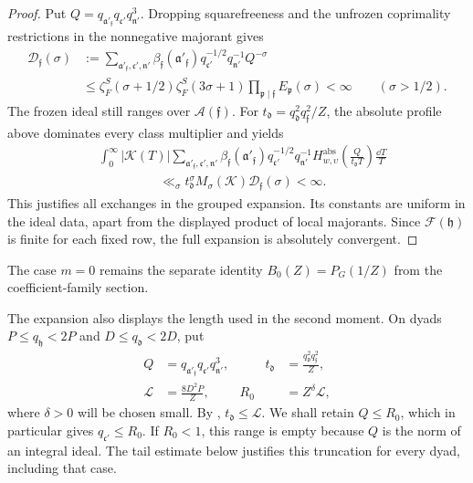 \begin{proof}
Put \(Q=q_{\mathfrak a'_{\mathfrak f}}q_{\mathfrak c'}q_{\mathfrak n'}^3\).
Dropping squarefreeness and the unfrozen coprimality restrictions in the
nonnegative majorant gives
\begin{equation}\label{eq:reflection-reflected-Dirichlet}
\begin{split}
 \mathcal D_{\mathfrak f}(\sigma)
 &:=\sum_{\mathfrak a'_{\mathfrak f},\mathfrak c',\mathfrak n'}
       \beta_{\mathfrak f}(\mathfrak a'_{\mathfrak f})
       q_{\mathfrak c'}^{-1/2}q_{\mathfrak n'}^{-1}Q^{-\sigma}\\
 &\le\zeta_F^S(\sigma+1/2)\zeta_F^S(3\sigma+1)
       \prod_{\mathfrak p\mid\mathfrak f}E_{\mathfrak p}(\sigma)
 <\infty\qquad(\sigma>1/2).
\end{split}
\end{equation}
The frozen ideal still ranges over \(\mathcal A(\mathfrak f)\).
For \(t_{\mathfrak d}=q_{\mathfrak d}^2q_{\mathfrak f}^2/Z\), the
absolute profile above dominates every class multiplier and yields
\begin{equation}\label{eq:reflection-reflected-Fubini}
\begin{split}
 &\int_0^\infty|\mathcal K(T)|
   \sum_{\mathfrak a'_{\mathfrak f},\mathfrak c',\mathfrak n'}
     \beta_{\mathfrak f}(\mathfrak a'_{\mathfrak f})
     q_{\mathfrak c'}^{-1/2}q_{\mathfrak n'}^{-1}
     H^{\mathrm{abs}}_{w,\upsilon}\!\left(
        \frac{Q}{t_{\mathfrak d}T}\right)\frac{\dd T}{T}\\
 &\hspace{2cm}\ll_\sigma
       t_{\mathfrak d}^{\sigma}M_\sigma(\mathcal K)
             \mathcal D_{\mathfrak f}(\sigma)<\infty.
\end{split}
\end{equation}
This justifies all exchanges in the grouped expansion.  Its constants
are uniform in the ideal data, apart from the displayed product of local
majorants.  Since \(\mathcal F(\mathfrak h)\) is finite for each fixed row,
the full expansion is absolutely convergent.
\end{proof}

The case \(m=0\) remains the separate identity
\(B_0(Z)=P_G(1/Z)\) from the coefficient-family section.

The expansion also displays the length used in the second moment.  On dyads
\(P\le q_{\mathfrak h}<2P\) and \(D\le q_{\mathfrak d}<2D\), put
\begin{equation}\label{eq:reflection-column-cutoff}
\begin{aligned}
 Q&=q_{\mathfrak a'_{\mathfrak f}}q_{\mathfrak c'}q_{\mathfrak n'}^3,
 &\qquad
 t_{\mathfrak d}&=\frac{q_{\mathfrak d}^2q_{\mathfrak f}^2}{Z},\\
 \mathcal L&=\frac{8D^2P}{Z},
 & R_0&=Z^\delta\mathcal L,
\end{aligned}
\end{equation}
where \(\delta>0\) will be chosen small.  By
, \(t_{\mathfrak d}\le\mathcal L\).
We shall retain \(Q\le R_0\), which in particular gives
\(q_{\mathfrak c'}\le R_0\).  If \(R_0<1\), this range is empty because
\(Q\) is the norm of an integral ideal.  The tail estimate below justifies
this truncation for every dyad, including that case.

